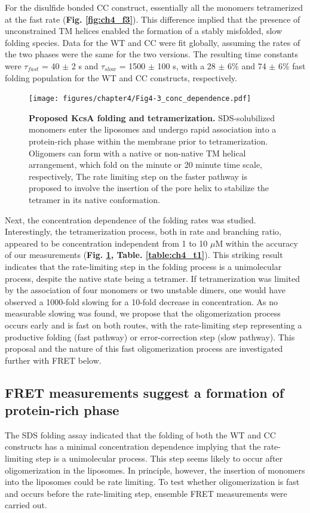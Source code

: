 For the disulfide bonded CC construct, essentially all the monomers tetramerized at the fast rate (\textbf{Fig. \ref{fig:ch4_f3}}). This difference implied that the presence of unconstrained TM helices enabled the formation of a stably misfolded, slow folding species. Data for the WT and CC were fit globally, assuming the rates of the two phases were the same for the two versions. The resulting time constants were $\tau_{fast}$ = 40 $\pm$ 2 s and $\tau_{slow}$ = 1500 $\pm$ 100 s, with a 28 $\pm$ 6\% and 74 $\pm$ 6\% fast folding population for the WT and CC constructs, respectively.

\begin{figure}[!ht]
\begin{center}
	\texttt{[image: figures/chapter4/Fig4-3\_conc\_dependence.pdf]}
\end{center}
	\caption{\textbf{Proposed KcsA folding and tetramerization.} SDS-solubilized monomers enter the liposomes and undergo rapid association into a protein-rich phase within the membrane prior to tetramerization. Oligomers can form with a native or non-native TM helical arrangement, which fold on the minute or 20 minute time scale, respectively, The rate limiting step on the faster pathway is proposed to involve the insertion of the pore helix to stabilize the tetramer in its native conformation.}
	\label{fig:ch4_f4}
\end{figure}

Next, the concentration dependence of the folding rates was studied. Interestingly, the tetramerization process, both in rate and branching ratio, appeared to be concentration independent from 1 to 10 $\mu$M within the accuracy of our measurements (\textbf{Fig. \ref{fig:ch4_f4}, Table. \ref{table:ch4_t1}}). This striking result indicates that the rate-limiting step in the folding process is a unimolecular process, despite the native state being a tetramer. If tetramerization was limited by the association of four monomers or two unstable dimers, one would have observed a 1000-fold slowing for a 10-fold decrease in concentration. As no measurable slowing was found, we propose that the oligomerization process occurs early and is fast on both routes, with the rate-limiting step representing a productive folding (fast pathway) or error-correction step (slow pathway). This proposal and the nature of this fast oligomerization process are investigated further with FRET below.

\subsection{FRET measurements suggest a formation of protein-rich phase}
The SDS folding assay indicated that the folding of both the WT and CC constructs has a minimal concentration dependence implying that the rate-limiting step is a unimolecular process. This step seems likely to occur after oligomerization in the liposomes. In principle, however, the insertion of monomers into the liposomes could be rate limiting. To test whether oligomerization is fast and occurs before the rate-limiting step, ensemble FRET measurements were carried out.

